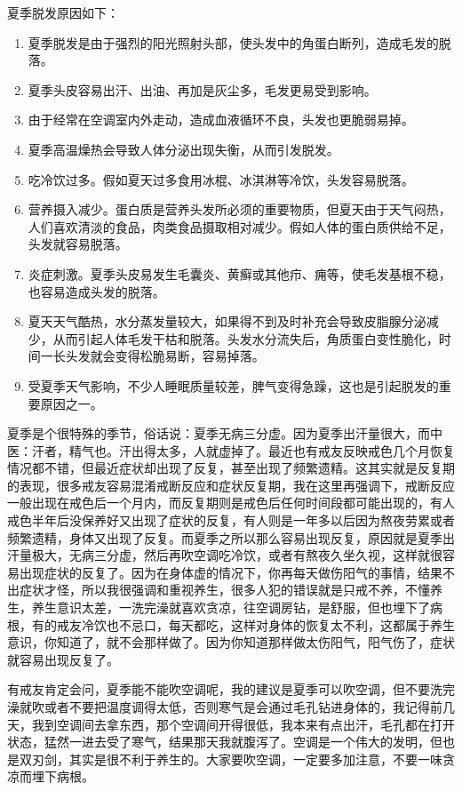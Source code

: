\documentclass{ctexart}
\begin{document}
夏季脱发原因如下：

\begin{enumerate}
    \item 夏季脱发是由于强烈的阳光照射头部，使头发中的角蛋白断列，造成毛发的脱落。
    \item 夏季头皮容易出汗、出油、再加是灰尘多，毛发更易受到影响。
    \item 由于经常在空调室内外走动，造成血液循环不良，头发也更脆弱易掉。
    \item 夏季高温燥热会导致人体分泌出现失衡，从而引发脱发。
    \item 吃冷饮过多。假如夏天过多食用冰棍、冰淇淋等冷饮，头发容易脱落。
    \item 营养摄入减少。蛋白质是营养头发所必须的重要物质，但夏天由于天气闷热，人们喜欢清淡的食品，肉类食品摄取相对减少。假如人体的蛋白质供给不足，头发就容易脱落。
    \item 炎症刺激。夏季头皮易发生毛囊炎、黄癣或其他疖、痈等，使毛发基根不稳，也容易造成头发的脱落。
    \item 夏天天气酷热，水分蒸发量较大，如果得不到及时补充会导致皮脂腺分泌减少，从而引起人体毛发干枯和脱落。头发水分流失后，角质蛋白变性脆化，时间一长头发就会变得松脆易断，容易掉落。
    \item 受夏季天气影响，不少人睡眠质量较差，脾气变得急躁，这也是引起脱发的重要原因之一。
\end{enumerate}

夏季是个很特殊的季节，俗话说：夏季无病三分虚。因为夏季出汗量很大，而中医：汗者，精气也。汗出得太多，人就虚掉了。最近也有戒友反映戒色几个月恢复情况都不错，但最近症状却出现了反复，甚至出现了频繁遗精。这其实就是反复期的表现，很多戒友容易混淆戒断反应和症状反复期，我在这里再强调下，戒断反应一般出现在戒色后一个月内，而反复期则是戒色后任何时间段都可能出现的，有人戒色半年后没保养好又出现了症状的反复，有人则是一年多以后因为熬夜劳累或者频繁遗精，身体又出现了反复。而夏季之所以那么容易出现反复，原因就是夏季出汗量极大，无病三分虚，然后再吹空调吃冷饮，或者有熬夜久坐久视，这样就很容易出现症状的反复了。因为在身体虚的情况下，你再每天做伤阳气的事情，结果不出症状才怪，所以我很强调和重视养生，很多人犯的错误就是只戒不养，不懂养生，养生意识太差，一洗完澡就喜欢贪凉，往空调房钻，是舒服，但也埋下了病根，有的戒友冷饮也不忌口，每天都吃，这样对身体的恢复太不利，这都属于养生意识，你知道了，就不会那样做了。因为你知道那样做太伤阳气，阳气伤了，症状就容易出现反复了。

有戒友肯定会问，夏季能不能吹空调呢，我的建议是夏季可以吹空调，但不要洗完澡就吹或者不要把温度调得太低，否则寒气是会通过毛孔钻进身体的，我记得前几天，我到空调间去拿东西，那个空调间开得很低，我本来有点出汗，毛孔都在打开状态，猛然一进去受了寒气，结果那天我就腹泻了。空调是一个伟大的发明，但也是双刃剑，其实是很不利于养生的。大家要吹空调，一定要多加注意，不要一味贪凉而埋下病根。
\end{document}
